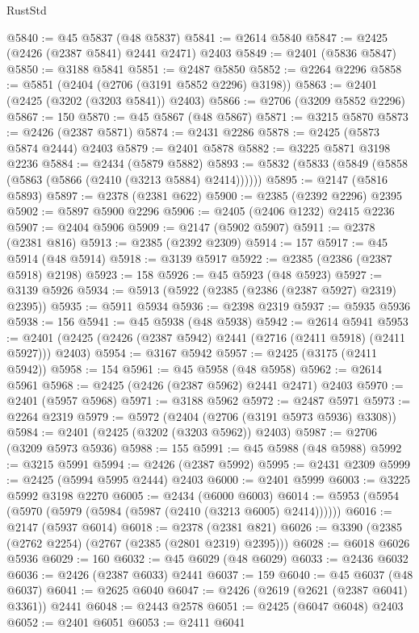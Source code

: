 \begin{lexlean}{RustStd}
\begin{coremodule}
@5840 := @45 @5837 (@48 @5837)
@5841 := @2614 @5840
@5847 := @2425 (@2426 (@2387 @5841) @2441 @2471) @2403
@5849 := @2401 (@5836 @5847)
@5850 := @3188 @5841
@5851 := @2487 @5850
@5852 := @2264 @2296
@5858 := @5851 (@2404 (@2706 (@3191 @5852 @2296) @3198))
@5863 := @2401 (@2425 (@3202 (@3203 @5841)) @2403)
@5866 := @2706 (@3209 @5852 @2296)
@5867 := 150
@5870 := @45 @5867 (@48 @5867)
@5871 := @3215 @5870
@5873 := @2426 (@2387 @5871)
@5874 := @2431 @2286
@5878 := @2425 (@5873 @5874 @2444) @2403
@5879 := @2401 @5878
@5882 := @3225 @5871 @3198 @2236
@5884 := @2434 (@5879 @5882)
@5893 := @5832 (@5833 (@5849 (@5858 (@5863 (@5866 (@2410 (@3213 @5884) @2414))))))
@5895 := @2147 (@5816 @5893)
@5897 := @2378 (@2381 @622)
@5900 := @2385 (@2392 @2296) @2395
@5902 := @5897 @5900 @2296
@5906 := @2405 (@2406 @1232) @2415 @2236
@5907 := @2404 @5906
@5909 := @2147 (@5902 @5907)
@5911 := @2378 (@2381 @816)
@5913 := @2385 (@2392 @2309)
@5914 := 157
@5917 := @45 @5914 (@48 @5914)
@5918 := @3139 @5917
@5922 := @2385 (@2386 (@2387 @5918) @2198)
@5923 := 158
@5926 := @45 @5923 (@48 @5923)
@5927 := @3139 @5926
@5934 := @5913 (@5922 (@2385 (@2386 (@2387 @5927) @2319) @2395))
@5935 := @5911 @5934
@5936 := @2398 @2319
@5937 := @5935 @5936
@5938 := 156
@5941 := @45 @5938 (@48 @5938)
@5942 := @2614 @5941
@5953 := @2401 (@2425 (@2426 (@2387 @5942) @2441 (@2716 (@2411 @5918) (@2411 @5927))) @2403)
@5954 := @3167 @5942
@5957 := @2425 (@3175 (@2411 @5942))
@5958 := 154
@5961 := @45 @5958 (@48 @5958)
@5962 := @2614 @5961
@5968 := @2425 (@2426 (@2387 @5962) @2441 @2471) @2403
@5970 := @2401 (@5957 @5968)
@5971 := @3188 @5962
@5972 := @2487 @5971
@5973 := @2264 @2319
@5979 := @5972 (@2404 (@2706 (@3191 @5973 @5936) @3308))
@5984 := @2401 (@2425 (@3202 (@3203 @5962)) @2403)
@5987 := @2706 (@3209 @5973 @5936)
@5988 := 155
@5991 := @45 @5988 (@48 @5988)
@5992 := @3215 @5991
@5994 := @2426 (@2387 @5992)
@5995 := @2431 @2309
@5999 := @2425 (@5994 @5995 @2444) @2403
@6000 := @2401 @5999
@6003 := @3225 @5992 @3198 @2270
@6005 := @2434 (@6000 @6003)
@6014 := @5953 (@5954 (@5970 (@5979 (@5984 (@5987 (@2410 (@3213 @6005) @2414))))))
@6016 := @2147 (@5937 @6014)
@6018 := @2378 (@2381 @821)
@6026 := @3390 (@2385 (@2762 @2254) (@2767 (@2385 (@2801 @2319) @2395)))
@6028 := @6018 @6026 @5936
@6029 := 160
@6032 := @45 @6029 (@48 @6029)
@6033 := @2436 @6032
@6036 := @2426 (@2387 @6033) @2441
@6037 := 159
@6040 := @45 @6037 (@48 @6037)
@6041 := @2625 @6040
@6047 := @2426 (@2619 (@2621 (@2387 @6041) @3361)) @2441
@6048 := @2443 @2578
@6051 := @2425 (@6047 @6048) @2403
@6052 := @2401 @6051
@6053 := @2411 @6041

\end{coremodule}
\end{lexlean}
